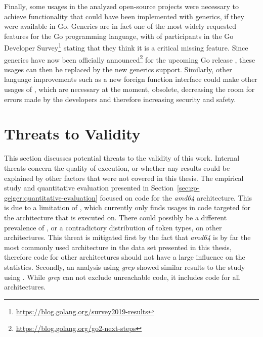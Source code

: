 Finally, some \unsafe{} usages in the analyzed open-source projects were necessary to achieve functionality that could
have been implemented with generics, if they were available in Go.
Generics are in fact one of the most widely requested features for the Go programming language, with  of
participants in the  Go Developer Survey\footnote{\url{https://blog.golang.org/survey2019-results}}
stating that they think it is a critical missing feature.
Since generics have now been officially announced\footnote{\url{https://blog.golang.org/go2-next-steps}} for the
upcoming Go release , these \unsafe{} usages can then be replaced by the new generics support.
Similarly, other language improvements such as a new foreign function interface could make other usages of \unsafe{},
which are necessary at the moment, obsolete, decreasing the room for errors made by the developers and therefore
increasing security and safety.



\section{Threats to Validity}\label{sec:discussion:threats-to-validity}

This section discusses potential threats to the validity of this work.
Internal threats concern the quality of execution, or whether any results could be explained by other factors that were
not covered in this thesis.
The empirical study and quantitative evaluation presented in Section~\ref{sec:go-geiger:quantitative-evaluation}
focused on code for the \textit{amd64} architecture.
This is due to a limitation of \toolGeiger{}, which currently only finds \unsafe{} usages in code targeted for the
architecture that \toolGeiger{} is executed on.
There could possibly be a different prevalence of \unsafe{}, or a contradictory distribution of \unsafe{} token types,
on other architectures.
This threat is mitigated first by the fact that \textit{amd64} is by far the most commonly used architecture in the
data set presented in this thesis, therefore code for other architectures should not have a large influence on the
statistics.
Secondly, an analysis using \textit{grep} showed similar results to the study using \toolGeiger{}.
While \textit{grep} can not exclude unreachable code, it includes code for all architectures.

